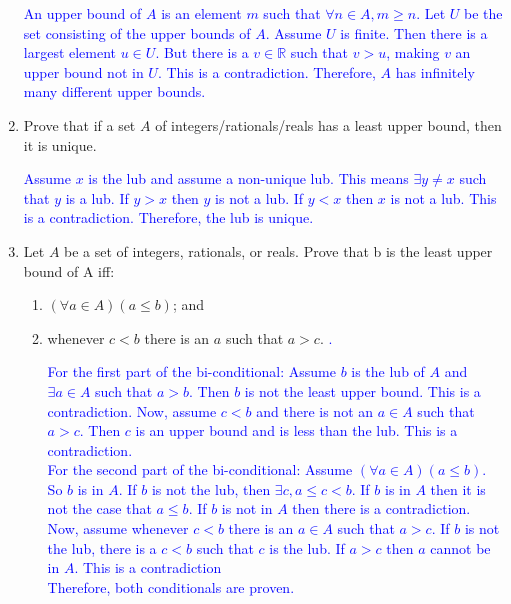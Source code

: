 \documentclass[13.5pt]{article}
\begin{document}
\begin{enumerate}
\textcolor{blue} {An upper bound of \(A\) is an element \(m\) such that \(\forall n \in A, m \geq n\). Let \(U\) be the set consisting of the upper bounds of \(A\). Assume \(U\) is finite. Then there is a largest element \(u \in U\). But there is a \(v \in \mathbb{R}\) such that \(v>u\), making \(v\) an upper bound not in \(U\). This is a contradiction. Therefore, \(A\) has infinitely many different upper bounds.} 

\item{Prove that if a set \(A\) of integers/rationals/reals has a least upper bound, then it is unique.}

\textcolor{blue} {Assume \(x\) is the lub and assume a non-unique lub.  This means \(\exists y \neq x\) such that \(y\) is a lub. If \(y>x\) then \(y\) is not a lub. If \(y<x\) then \(x\) is not a lub. This is a contradiction. Therefore, the lub is unique.} 

\item{Let \(A\) be a set of integers, rationals, or reals. Prove that b is the least upper bound of A iff:}

\begin{enumerate}
\setlength{\itemindent}{.1in}
\item{\((\forall a \in A)(a \leq b)\); and}

\item{whenever \(c<b\) there is an \(a\) such that \(a>c\).}
\textcolor{blue} {.}

\textcolor{blue} {For the first part of the bi-conditional:} 
\textcolor{blue} {Assume \(b\) is the lub of \(A\) and \(\exists a \in A\) such that \(a>b\). Then \(b\) is not the least upper bound. This is a contradiction. Now, assume \(c<b\) and there is not an \(a \in A\) such that \(a>c\). Then \(c\) is an upper bound and is less than the lub. This is a contradiction.}\\ 
\textcolor{blue} {For the second part of the bi-conditional:} 
\textcolor{blue} {Assume \((\forall a \in A)(a\leq b)\). So \(b\) is in \(A\). If \(b\) is not the lub, then \(\exists c, a \leq c < b\). If \(b\) is in \(A\) then it is not the case that \(a \leq b\). If \(b\) is not in \(A\) then there is a contradiction. Now, assume whenever \(c<b\) there is an \(a \in A\) such that \(a>c\). If \(b\) is not the lub, there is a \(c<b\) such that \(c\) is the lub. If \(a>c\) then \(a\) cannot be in \(A\). This is a contradiction}\\ 
\textcolor{blue} {Therefore, both conditionals are proven.}


\end{enumerate}
\end{enumerate}
\end{document}
